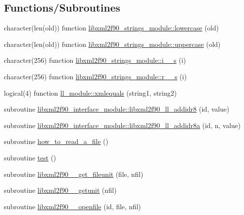\subsection*{Functions/\+Subroutines}
\begin{DoxyCompactItemize}
\item 
character(len(old)) function \hyperlink{namespacelibxml2f90__strings__module_a4e91e2d759dc3546b64d31ee3d35e2e7}{libxml2f90\+\_\+strings\+\_\+module\+::lowercase} (old)
\item 
character(len(old)) function \hyperlink{namespacelibxml2f90__strings__module_a9793dff5114e7403d7f95c0b8f493e1d}{libxml2f90\+\_\+strings\+\_\+module\+::uppercase} (old)
\item 
character(256) function \hyperlink{namespacelibxml2f90__strings__module_a1ae9fdac593cf7dfb1239930b06f7151}{libxml2f90\+\_\+strings\+\_\+module\+::i\+\_\+\_\+s} (i)
\item 
character(256) function \hyperlink{namespacelibxml2f90__strings__module_a3e162b5f18f39c8769659ce67d2357a4}{libxml2f90\+\_\+strings\+\_\+module\+::r\+\_\+\_\+s} (i)
\item 
logical(4) function \hyperlink{namespacell__module_a974bd171cab1f518654379cd52246d25}{ll\+\_\+module\+::xmlequals} (string1, string2)
\item 
subroutine \hyperlink{namespacelibxml2f90__interface__module_a74e6744ce3a60bdf75d94db9e9683fa8}{libxml2f90\+\_\+interface\+\_\+module\+::libxml2f90\+\_\+ll\+\_\+addidr8} (id, value)
\item 
subroutine \hyperlink{namespacelibxml2f90__interface__module_a2532faf7ac758a77d95784b4bf95e13d}{libxml2f90\+\_\+interface\+\_\+module\+::libxml2f90\+\_\+ll\+\_\+addidr8a} (id, n, value)
\item 
subroutine \hyperlink{libxml2f90_8f90__pp_8f90_a5522c3c4e981b0b62e1ddd6f3d77ba44}{how\+\_\+to\+\_\+read\+\_\+a\+\_\+file} ()
\item 
subroutine \hyperlink{libxml2f90_8f90__pp_8f90_a538115974c74d38b05d3ff4d4aa7d712}{test} ()
\item 
subroutine \hyperlink{libxml2f90_8f90__pp_8f90_a43747477c64dd030f8e9dd0cc3ee36ad}{libxml2f90\+\_\+\+\_\+get\+\_\+fileunit} (file, nfil)
\item 
subroutine \hyperlink{libxml2f90_8f90__pp_8f90_a91985cd2da8e09ba96809c73c6fa0286}{libxml2f90\+\_\+\+\_\+getunit} (nfil)
\item 
subroutine \hyperlink{libxml2f90_8f90__pp_8f90_afd27bcb20bad3d7a8445a9090dcd8d01}{libxml2f90\+\_\+\+\_\+openfile} (id, file, nfil)

\end{DoxyCompactItemize}

